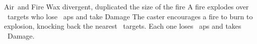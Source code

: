   {Air\ and Fire}%
  {Wax}%
  {divergent, duplicated}%
  {the size of the fire}%
  {A fire explodes over \spellArea\ targets who lose ~\glspl{ap} and take  Damage}%
  {
    The caster encourages a fire to burn to explosion, knocking back the nearest \spellArea\ targets.
    Each one loses ~\glspl{ap} and takes ~Damage.
  }

